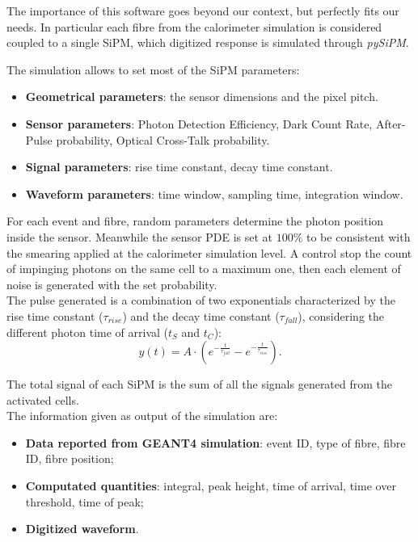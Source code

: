 The importance of this software goes beyond our context, but perfectly fits our needs. In particular each fibre from the calorimeter simulation is considered coupled to a single SiPM, which digitized response is simulated through \textit{pySiPM}.

The simulation allows to set most of the SiPM parameters:
\begin{itemize}
	\item \textbf{Geometrical parameters}: the sensor dimensions and the pixel pitch.
	\item \textbf{Sensor parameters}: Photon Detection Efficiency, Dark Count Rate, After-Pulse probability, Optical Cross-Talk probability.
	\item \textbf{Signal parameters}: rise time constant, decay time constant.
	\item \textbf{Waveform parameters}: time window, sampling time, integration window.
\end{itemize}

For each event and fibre, random parameters determine the photon position inside the sensor. %
Meanwhile the sensor PDE is set at $100\%$ to be consistent with the smearing applied at the calorimeter simulation level.
A control stop the count of impinging photons on the same cell to a maximum one, then each element of noise is generated with the set probability.\\
The pulse generated is a combination of two exponentials characterized by the rise time constant ($\tau_{rise}$) and the decay time constant ($\tau_{fall}$), considering the different photon time of arrival ($t_S$ and $t_C$):
\begin{equation}
	y(t)= A \cdot \left( e^{-\frac{t}{\tau_{fall}}} - e^{-\frac{t}{\tau_{rise}}}\right).
	\label{form:resp_func}
\end{equation}

The total signal of each SiPM is the sum of all the signals generated from the activated cells.\\

The information given as output of the simulation are:
\begin{itemize}
	\item \textbf{Data reported from GEANT4 simulation}: event ID, type of fibre, fibre ID, fibre position;
	\item \textbf{Computated quantities}: integral, peak height, time of arrival, time over threshold, time of peak;
	\item \textbf{Digitized waveform}.
\end{itemize}

